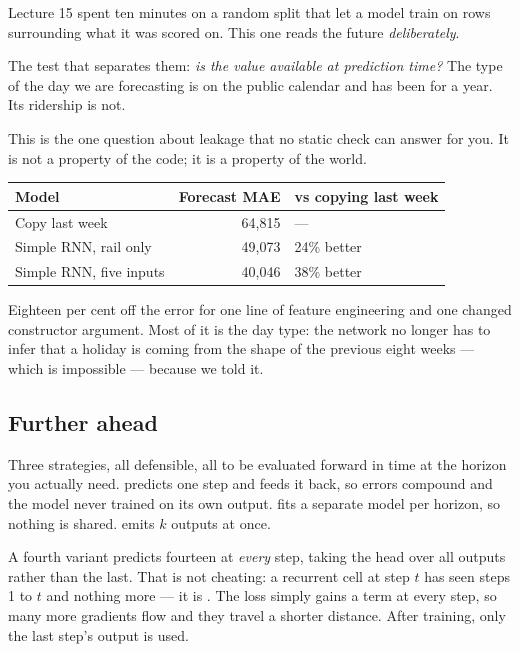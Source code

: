 \documentclass[11pt,a4paper]{article}
\begin{document}
\begin{failbox}[title={Wait --- that is a \code{shift(-1)}}]
Lecture 15 spent ten minutes on a random split that let a model train on rows
surrounding what it was scored on. This one reads the future \emph{deliberately}.

The test that separates them: \emph{is the value available at prediction time?}
The type of the day we are forecasting is on the public calendar and has been
for a year. Its ridership is not.

This is the one question about leakage that no static check can answer for you.
It is not a property of the code; it is a property of the world.
\end{failbox}

\begin{center}
\small
\begin{tabular}{lrl}
\toprule
\textbf{Model} & \textbf{Forecast MAE} & \textbf{vs copying last week} \\
\midrule
Copy last week & 64{,}815 & --- \\
Simple RNN, rail only & 49{,}073 & 24\% better \\
Simple RNN, five inputs & 40{,}046 & 38\% better \\
\bottomrule
\end{tabular}
\end{center}

Eighteen per cent off the error for one line of feature engineering and one
changed constructor argument. Most of it is the day type: the network no longer
has to infer that a holiday is coming from the shape of the previous eight
weeks --- which is impossible --- because we told it.

\subsection{Further ahead}

Three strategies, all defensible, all to be evaluated forward in time at the
horizon you actually need.  predicts one step and feeds it
back, so errors compound and the model never trained on its own output.
 fits a separate model per horizon, so nothing is shared.
 emits $k$ outputs at once.

A fourth variant predicts fourteen at \emph{every} step, taking the head over
all outputs rather than the last. That is not cheating: a recurrent cell at
step $t$ has seen steps 1 to $t$ and nothing more --- it is . The
loss simply gains a term at every step, so many more gradients flow and they
travel a shorter distance. After training, only the last step's output is used.
\end{document}
